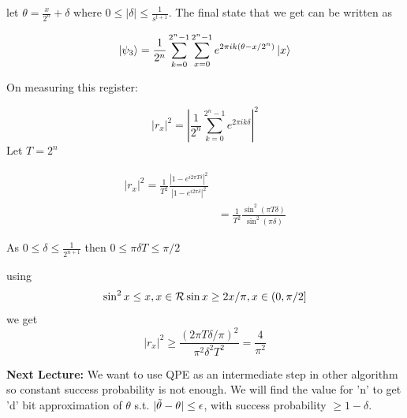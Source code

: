 \documentclass[11.5pt, paper=a4]{article}
\theoremstyle{definition}
\numberwithin{theorem}{section}
\begin{document}
\begin{itemize}
    \par let $\theta = \frac{x}{2^n} + \delta$ where $0 \le |\delta| \leq \frac{1}{s^{t+1}}$. The final state that we get can be written as 
    
    $$
    \ket{\psi_3} = \frac{1}{2^n} \sum_{k = 0}^{2^n -1}\sum_{x = 0}^{2^n -1}e^{2\pi ik (\theta - x/2^n) }\ket{x}
    $$
    
    On measuring this register:
    
    $$
        |r_x|^2 = |\frac{1}{2^n}  \sum_{k = 0}^{2^n -1}e^{2\pi ik\delta }|^2
    $$
    Let $T = 2^n$
    
    $$
    \begin{aligned}
        |r_x|^2 = \frac{1}{T^2} \frac{|1- e^{i2\pi T \delta}|^2}{|1- e^{i2\pi \delta}|^2}\\
        &= \frac{1}{T^2} \frac{\sin^2(\pi T \delta)}{\sin^2(\pi \delta)}
    \end{aligned}
    $$
    
    As $0 \leq \delta \leq \frac{1}{2^{n+1}}$ then $0\leq \pi \delta T \leq \pi/2$
    
    using 
    $$
        \sin^2x \leq x, x \in \mathcal{R} \\
        \sin x \geq 2x/\pi, x \in (0, \pi/2]
    $$
    we get
    $$
        |r_x|^2 \geq \frac{(2 \pi T \delta / \pi)^2}{\pi^2 \delta^2 T^2} = \frac{4}{\pi^2}
    $$
    
    \textbf{Next Lecture:} We want to use QPE as an intermediate step in other algorithm so constant success probability is not enough. We will find the value for 'n' to get 'd' bit approximation of $\theta$ s.t. $|\Tilde{\theta} - \theta| \leq \epsilon$, with success probability  $\geq 1-\delta$.
\end{itemize}



\end{document}
